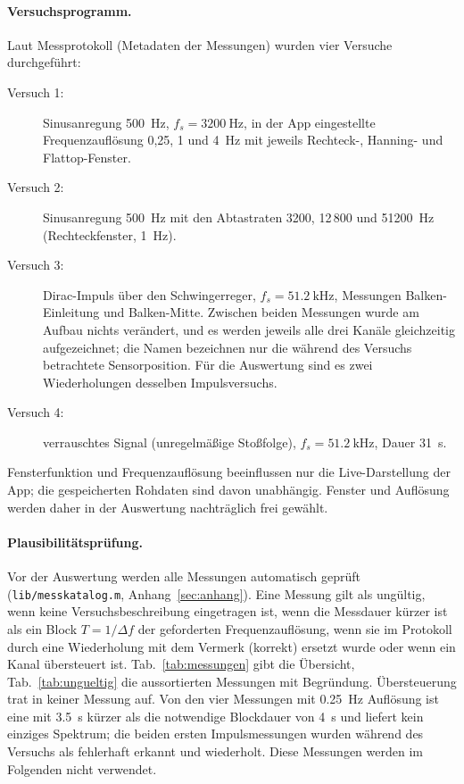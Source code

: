 \documentclass[a4paper,11pt,parskip=half,toc=listof,bibliography=totoc]{scrartcl}
\newcommand{\tab}[1]{Tab.~\ref{#1}}
\begin{document}
\paragraph{Versuchsprogramm.} Laut Messprotokoll (Metadaten der Messungen)
wurden vier Versuche durchgeführt:
\begin{description}
  \item[Versuch 1:] Sinusanregung \SI{500}{\hertz}, $f_s=\SI{3200}{\hertz}$,
    in der App eingestellte Frequenzauflösung 0,25, 1 und \SI{4}{\hertz} mit
    jeweils Rechteck-, Hanning- und Flattop-Fenster.
  \item[Versuch 2:] Sinusanregung \SI{500}{\hertz} mit den Abtastraten
    3200, 12\,800 und \SI{51200}{\hertz} (Rechteckfenster, \SI{1}{\hertz}).
  \item[Versuch 3:] Dirac-Impuls über den Schwingerreger,
    $f_s=\SI{51.2}{\kilo\hertz}$, Messungen \glqq Balken-Einleitung\grqq{} und
    \glqq Balken-Mitte\grqq. Zwischen beiden Messungen wurde am Aufbau nichts
    verändert, und es werden jeweils alle drei Kanäle gleichzeitig
    aufgezeichnet; die Namen bezeichnen nur die während des Versuchs
    betrachtete Sensorposition. Für die Auswertung sind es zwei
    Wiederholungen desselben Impulsversuchs.
  \item[Versuch 4:] verrauschtes Signal (unregelmäßige Stoßfolge),
    $f_s=\SI{51.2}{\kilo\hertz}$, Dauer \SI{31}{\second}.
\end{description}
Fensterfunktion und Frequenzauflösung beeinflussen nur die Live-Darstellung
der App; die gespeicherten Rohdaten sind davon unabhängig. Fenster und
Auflösung werden daher in der Auswertung nachträglich frei gewählt.

\paragraph{Plausibilitätsprüfung.} Vor der Auswertung werden alle Messungen
automatisch geprüft (\texttt{lib/messkatalog.m}, Anhang~\ref{sec:anhang}).
Eine Messung gilt als ungültig, wenn keine Versuchsbeschreibung eingetragen
ist, wenn die Messdauer kürzer ist als ein Block $T=1/\Delta f$ der geforderten
Frequenzauflösung, wenn sie im Protokoll durch eine Wiederholung mit dem
Vermerk \glqq (korrekt)\grqq{} ersetzt wurde oder wenn ein Kanal übersteuert
ist. \tab{tab:messungen} gibt die Übersicht, \tab{tab:ungueltig} die
aussortierten Messungen mit Begründung. Übersteuerung trat in keiner Messung
auf. Von den vier Messungen mit \SI{0.25}{\hertz} Auflösung ist eine mit
\SI{3.5}{\second} kürzer als die notwendige Blockdauer von \SI{4}{\second}
und liefert kein einziges Spektrum; die beiden ersten Impulsmessungen wurden
während des Versuchs als fehlerhaft erkannt und wiederholt. Diese Messungen
werden im Folgenden nicht verwendet.
\end{document}

